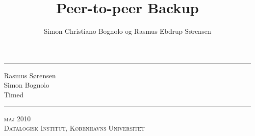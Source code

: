 

\title{Peer-to-peer Backup}
\author{Simon Christiano Bognolo og Rasmus Ebdrup Sørensen}


\begin{titlingpage}
\newcommand{\HRule}{\rule{\linewidth}{1mm}}
\noindent\HRule
\begin{flushright}
                \large 
                Rasmus Sørensen\\
                Simon Bognolo
                \\[5mm]
            \huge Timed \pycsp
\end{flushright}                
\HRule
{}
\begin{center}
\large\textsc{maj 2010}\\
\large\textsc{Datalogisk Institut, Københavns Universitet}
\end{center}
\end{titlingpage}

\frontmatter

\tableofcontents

\listoffixmes



\mainmatter
\OnehalfSpacing
\selectfont 





 


\SingleSpacing
\printbibliography



